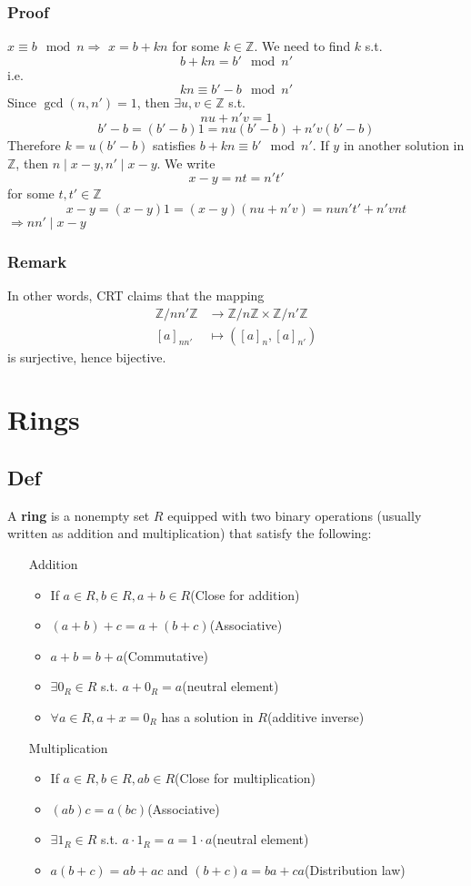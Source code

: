 \documentclass{book}
\begin{document}
\subsection*{Proof}
$x\equiv b\mod n$$\Rightarrow$ $x=b+kn$ for some $k\in \mathbb Z$. We need to find $k$ s.t. $$b+kn=b'\mod n'$$i.e.$$kn\equiv b'-b\mod n'$$
Since $\gcd(n,n')=1$, then $\exists u,v\in \mathbb Z$ s.t. $$nu+n'v=1$$
$$b'-b=(b'-b)1=nu(b'-b)+n'v(b'-b)$$
Therefore $k=u(b'-b)$ satisfies $b+kn\equiv b'\mod n'$. If $y$ in another solution in $\mathbb Z$, then $n\mid x-y,n'\mid x-y$. We write $$x-y=nt=n't'$$ for some $t,t'\in \mathbb Z$ 
$$x-y=(x-y)1=(x-y)(nu+n'v)=nun't'+n'vnt$$
$\Rightarrow nn'\mid x-y$
\subsection*{Remark}
In other words, CRT claims that the mapping
$$\begin{aligned}
	\mathbb Z/nn'\mathbb Z&\rightarrow \mathbb Z/n\mathbb Z\times\mathbb Z/n'\mathbb Z\\
	[a]_{nn'}&\mapsto([a]_n,[a]_{n'})
\end{aligned}$$ is surjective, hence bijective.
\chapter{Rings}
\section{Def}
A \textbf{ring} is a nonempty set $R$ equipped with two binary operations (usually written as addition and multiplication) that satisfy the following:
\begin{itemize}
	\item [Addition]\begin{itemize}
		\item If $a\in R,b\in R, a+b\in R$\quad(Close for addition)
		\item $(a+b)+c=a+(b+c)$\quad(Associative)
		\item $a+b=b+a$\quad(Commutative)
		\item $\exists 0_R\in R$ s.t. $a+0_R=a$\quad(neutral element)
		\item $\forall a\in R,a+x=0_R$ has a solution in $R$\quad(additive inverse)
	\end{itemize}
	\item[Multiplication]\begin{itemize}
		\item If $a\in R,b\in R, ab\in R$\quad(Close for multiplication)
		\item $(ab)c=a(bc)$\quad(Associative)
		\item $\exists 1_R\in R$ s.t. $a\cdot 1_R=a=1\cdot a$\quad(neutral element)
		\item $a(b+c)=ab+ac$ and $(b+c)a=ba+ca$\quad(Distribution law)
	\end{itemize}
\end{itemize}
\end{document}
